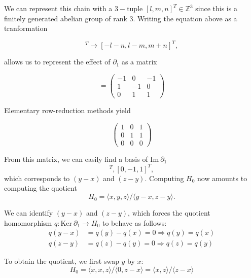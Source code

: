 We can represent this chain with a $3-$tuple $[l,m,n]^{T} \in \mathbb{Z}^{3}$ since this is a finitely generated abelian group of rank $3$. Writing the equation above as a tranformation

\begin{equation*}
  [l,m,n]^{T} \to [-l-n,l-m,m+n]^{T},
\end{equation*}

allows us to represent the effect of $\partial_{1}$ as a matrix

\begin{equation*}
  [\partial_{1}] =
  \begin{pmatrix}
    -1 & 0 & -1 \\
    1 & -1 & 0 \\
    0 & 1 & 1
  \end{pmatrix}
\end{equation*}

Elementary row-reduction methods yield

\begin{equation*}
  \begin{pmatrix}
    1 & 0 & 1 \\
    0 & 1 & 1 \\
    0 & 0 & 0
  \end{pmatrix}
\end{equation*}

From this matrix, we can easily find a basis of $\text{Im}\:\partial_{1}$
\begin{equation*}
  [-1,1,0]^{T}, [0, -1, 1]^{T},
\end{equation*}
which corresponds to $(y-x)$ and $(z-y)$. Computing $H_{0}$ now amounts to computing the quotient
\begin{equation*}
  H_{0} = \langle x,y,z \rangle / \langle y-x, z-y \rangle.
\end{equation*}

We can identify $(y-x)$ and $(z-y)$, which forces the quotient homomorphism $q: \text{Ker}\:\partial_{1} \to H_{0}$ to behave as follows:
\begin{align*}
  q(y-x) &= q(y) - q(x) = 0 \Longrightarrow q(y) = q(x) \\
  q(z-y) &= q(z) - q(y) = 0 \Longrightarrow q(z) = q(y)
\end{align*}

To obtain the quotient, we first swap $y$ by $x$:
\begin{equation*}
  H_{0} = \langle x,x,z \rangle / \langle 0, z-x \rangle = \langle x,z \rangle / \langle z-x \rangle
\end{equation*}

